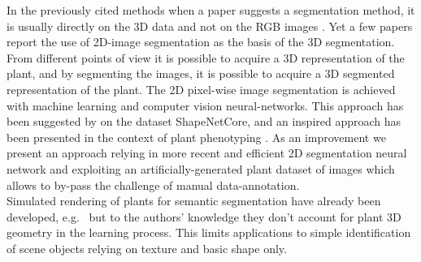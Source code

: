 In the previously cited methods when a paper suggests a segmentation method, it is usually directly on the 3D data and not on the RGB images \cite{santos_automatic_nodate-1}. Yet a few papers report the use of 2D-image segmentation as the basis of the 3D segmentation. From different points of view it is possible to acquire a 3D representation of the plant, and by segmenting the images, it is possible to acquire a 3D segmented representation of the plant. The 2D pixel-wise image segmentation is achieved with machine learning and computer vision neural-networks. This approach has been suggested by \cite{kalogerakis_3d_2017} on the dataset ShapeNetCore, and an inspired approach has been presented in the context of plant phenotyping \cite{shi_plant-part_2019}. As an improvement we present an approach relying in more recent and efficient 2D segmentation neural network and exploiting an artificially-generated plant dataset of images which allows to by-pass the challenge of manual data-annotation.\\
 Simulated rendering of plants for semantic segmentation have already been developed, e.g.~\cite{duboudin_toward_2019, ward_deep_2018} but to the authors' knowledge they don't account for plant 3D geometry in the learning process. This limits applications to simple identification of scene objects relying on texture and basic shape only.


